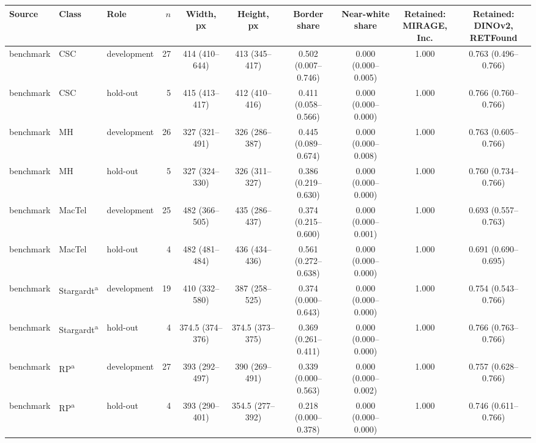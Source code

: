 \begin{tabular}{@{}lllrcccccc@{}}
\toprule
Source & Class & Role & $n$ & Width, px & Height, px & Border share & Near-white share & \makecell{Retained:\\MIRAGE, Inc.} & \makecell{Retained:\\DINOv2, RETFound} \\
\midrule
benchmark & CSC & development & 27 & 414 (410--644) & 413 (345--417) & 0.502 (0.007--0.746) & 0.000 (0.000--0.005) & 1.000 & 0.763 (0.496--0.766) \\
benchmark & CSC & hold-out & 5 & 415 (413--417) & 412 (410--416) & 0.411 (0.058--0.566) & 0.000 (0.000--0.000) & 1.000 & 0.766 (0.760--0.766) \\
benchmark & MH & development & 26 & 327 (321--491) & 326 (286--387) & 0.445 (0.089--0.674) & 0.000 (0.000--0.008) & 1.000 & 0.763 (0.605--0.766) \\
benchmark & MH & hold-out & 5 & 327 (324--330) & 326 (311--327) & 0.386 (0.219--0.630) & 0.000 (0.000--0.000) & 1.000 & 0.760 (0.734--0.766) \\
benchmark & MacTel & development & 25 & 482 (366--505) & 435 (286--437) & 0.374 (0.215--0.600) & 0.000 (0.000--0.001) & 1.000 & 0.693 (0.557--0.763) \\
benchmark & MacTel & hold-out & 4 & 482 (481--484) & 436 (434--436) & 0.561 (0.272--0.638) & 0.000 (0.000--0.000) & 1.000 & 0.691 (0.690--0.695) \\
benchmark & Stargardt\textsuperscript{a} & development & 19 & 410 (332--580) & 387 (258--525) & 0.374 (0.000--0.643) & 0.000 (0.000--0.000) & 1.000 & 0.754 (0.543--0.766) \\
benchmark & Stargardt\textsuperscript{a} & hold-out & 4 & 374.5 (374--376) & 374.5 (373--375) & 0.369 (0.261--0.411) & 0.000 (0.000--0.000) & 1.000 & 0.766 (0.763--0.766) \\
benchmark & RP\textsuperscript{a} & development & 27 & 393 (292--497) & 390 (269--491) & 0.339 (0.000--0.563) & 0.000 (0.000--0.002) & 1.000 & 0.757 (0.628--0.766) \\
benchmark & RP\textsuperscript{a} & hold-out & 4 & 393 (290--401) & 354.5 (277--392) & 0.218 (0.000--0.378) & 0.000 (0.000--0.000) & 1.000 & 0.746 (0.611--0.766) \\

\end{tabular}

